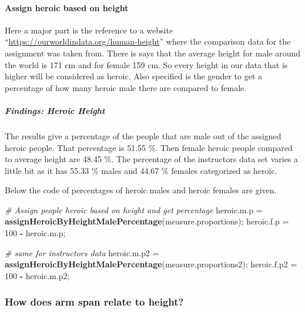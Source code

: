 \documentclass[]{article}
\newenvironment{Shaded}{\begin{snugshade}}{\end{snugshade}}
\newcommand{\CommentTok}[1]{\textcolor[rgb]{0.56,0.35,0.01}{\textit{#1}}}
\newcommand{\DecValTok}[1]{\textcolor[rgb]{0.00,0.00,0.81}{#1}}
\newcommand{\KeywordTok}[1]{\textcolor[rgb]{0.13,0.29,0.53}{\textbf{#1}}}
\newcommand{\NormalTok}[1]{#1}
\newcommand{\OperatorTok}[1]{\textcolor[rgb]{0.81,0.36,0.00}{\textbf{#1}}}
\newcommand{\StringTok}[1]{\textcolor[rgb]{0.31,0.60,0.02}{#1}}
\begin{document}
\newpage

\paragraph{Assign heroic based on height}
\label{sec:appendix-heroic-height}

Here a major part is the reference to a website
``\url{https://ourworldindata.org/human-height}'' where the comparison
data for the assignment was taken from. There is says that the average
height for male around the world is 171 cm and for female 159 cm. So
every height in our data that is higher will be considered as heroic.
Also specified is the gender to get a percentage of how many heroic male
there are compared to female.

\subparagraph{Findings: Heroic Height}
\label{sec:appendix-findings-heroic-height}

The results give a percentage of the people that are male out of the
assigned heroic people. That percentage is 51.55 \%. Then female heroic
people compared to average height are 48.45 \%. The percentage of the
instructors data set varies a little bit as it has 55.33 \% males and
44.67 \% females categorized as heroic.

Below the code of percentages of heroic males and heroic females are
given.

\begin{Shaded}
\begin{Highlighting}[]
\CommentTok{\# Assign people heroic based on height and get percentage}
\NormalTok{heroic.m.p =}\StringTok{ }\KeywordTok{assignHeroicByHeightMalePercentage}\NormalTok{(measure.proportions);}
\NormalTok{heroic.f.p =}\StringTok{ }\DecValTok{100} \OperatorTok{{-}}\StringTok{ }\NormalTok{heroic.m.p;}

\CommentTok{\# same for instructors data}
\NormalTok{heroic.m.p2 =}\StringTok{ }\KeywordTok{assignHeroicByHeightMalePercentage}\NormalTok{(measure.proportions2);}
\NormalTok{heroic.f.p2 =}\StringTok{ }\DecValTok{100} \OperatorTok{{-}}\StringTok{ }\NormalTok{heroic.m.p2;}
\end{Highlighting}
\end{Shaded}

\newpage

\subsubsection{How does arm span relate to height?}
\label{sec:appendix-arm-span-vs-height}
\end{document}
